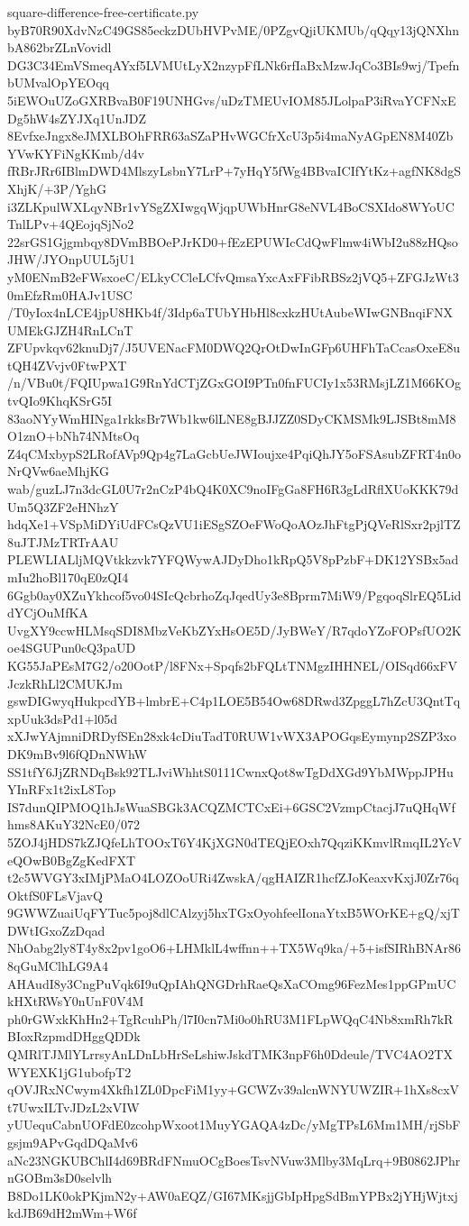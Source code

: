 \documentclass[11pt]{article}
\theoremstyle{definition}
\theoremstyle{remark}
\begin{document}
\begin{filecontents*}[overwrite]{square-difference-free-certificate.py}
byB70R90XdvNzC49GS85eckzDUbHVPvME/0PZgvQjiUKMUb/qQqy13jQNXhnbA862brZLnVovidl
DG3C34EmVSmeqAYxf5LVMUtLyX2nzypFfLNk6rfIaBxMzwJqCo3BIs9wj/TpefnbUMvalOpYEOqq
5iEWOuUZoGXRBvaB0F19UNHGvs/uDzTMEUvIOM85JLolpaP3iRvaYCFNxEDg5hW4sZYJXq1UnJDZ
8EvfxeJngx8eJMXLBOhFRR63aSZaPHvWGCfrXcU3p5i4maNyAGpEN8M40ZbYVwKYFiNgKKmb/d4v
fRBrJRr6IBlmDWD4MlszyLsbnY7LrP+7yHqY5fWg4BBvaICIfYtKz+agfNK8dgSXhjK/+3P/YghG
i3ZLKpulWXLqyNBr1vYSgZXIwgqWjqpUWbHnrG8eNVL4BoCSXIdo8WYoUCTnlLPv+4QEojqSjNo2
22srGS1Gjgmbqy8DVmBBOePJrKD0+fEzEPUWIcCdQwFlmw4iWbI2u88zHQsoJHW/JYOnpUUL5jU1
yM0ENmB2eFWsxoeC/ELkyCCleLCfvQmsaYxcAxFFibRBSz2jVQ5+ZFGJzWt30mEfzRm0HAJv1USC
/T0yIox4nLCE4jpU8HKb4f/3Idp6aTUbYHbHl8cxkzHUtAubeWIwGNBnqiFNXUMEkGJZH4RnLCnT
ZFUpvkqv62knuDj7/J5UVENacFM0DWQ2QrOtDwInGFp6UHFhTaCcasOxeE8utQH4ZVvjv0FtwPXT
/n/VBu0t/FQIUpwa1G9RnYdCTjZGxGOI9PTn0fnFUCIy1x53RMsjLZ1M66KOgtvQIo9KhqKSrG5I
83aoNYyWmHINga1rkksBr7Wb1kw6lLNE8gBJJZZ0SDyCKMSMk9LJSBt8mM8O1znO+bNh74NMtsOq
Z4qCMxbypS2LRofAVp9Qp4g7LaGcbUeJWIoujxe4PqiQhJY5oFSAsubZFRT4n0oNrQVw6aeMhjKG
wab/guzLJ7n3dcGL0U7r2nCzP4bQ4K0XC9noIFgGa8FH6R3gLdRflXUoKKK79dUm5Q3ZF2eHNhzY
hdqXe1+VSpMiDYiUdFCsQzVU1iESgSZOeFWoQoAOzJhFtgPjQVeRlSxr2pjlTZ8uJTJMzTRTrAAU
PLEWLIALljMQVtkkzvk7YFQWywAJDyDho1kRpQ5V8pPzbF+DK12YSBx5admIu2hoBl170qE0zQI4
6Ggb0ay0XZuYkhcof5vo04SIcQcbrhoZqJqedUy3e8Bprm7MiW9/PgqoqSlrEQ5LiddYCjOuMfKA
UvgXY9ccwHLMsqSDI8MbzVeKbZYxHsOE5D/JyBWeY/R7qdoYZoFOPsfUO2Koe4SGUPun0cQ3paUD
KG55JaPEsM7G2/o20OotP/l8FNx+Spqfs2bFQLtTNMgzIHHNEL/OISqd66xFVJczkRhLl2CMUKJm
gswDIGwyqHukpcdYB+lmbrE+C4p1LOE5B54Ow68DRwd3ZpggL7hZcU3QntTqxpUuk3dsPd1+l05d
xXJwYAjmniDRDyfSEn28xk4cDiuTadT0RUW1vWX3APOGqsEymynp2SZP3xoDK9mBv9l6fQDnNWhW
SS1tfY6JjZRNDqBsk92TLJviWhhtS0111CwnxQot8wTgDdXGd9YbMWppJPHuYInRFx1t2ixL8Top
IS7dunQIPMOQ1hJsWuaSBGk3ACQZMCTCxEi+6GSC2VzmpCtacjJ7uQHqWfhms8AKuY32NcE0/072
5ZOJ4jHDS7kZJQfeLhTOOxT6Y4KjXGN0dTEQjEOxh7QqziKKmvlRmqIL2YcVeQOwB0BgZgKedFXT
t2c5WVGY3xIMjPMaO4LOZOoURi4ZwskA/qgHAIZR1hcfZJoKeaxvKxjJ0Zr76qOktfS0FLsVjavQ
9GWWZuaiUqFYTuc5poj8dlCAlzyj5hxTGxOyohfeelIonaYtxB5WOrKE+gQ/xjTDWtIGxoZzDqad
NhOabg2ly8T4y8x2pv1goO6+LHMklL4wffnn++TX5Wq9ka/+5+isfSIRhBNAr868qGuMClhLG9A4
AHAudI8y3CngPuVqk6I9uQpIAhQNGDrhRaeQsXaCOmg96FezMes1ppGPmUCkHXtRWsY0nUnF0V4M
ph0rGWxkKhHn2+TgRcuhPh/l7I0cn7Mi0o0hRU3M1FLpWQqC4Nb8xmRh7kRBIoxRzpmdDHggQDDk
QMRlTJMlYLrrsyAnLDnLbHrSeLshiwJskdTMK3npF6h0Ddeule/TVC4AO2TXWYEXK1jG1ubofpT2
qOVJRxNCwym4Xkfh1ZL0DpcFiM1yy+GCWZv39alcnWNYUWZIR+1hXs8cxVt7UwxILTvJDzL2xVIW
yUUequCabnUOFdE0zcohpWxoot1MuyYGAQA4zDc/yMgTPsL6Mm1MH/rjSbFgsjm9APvGqdDQaMv6
aNc23NGKUBChlI4d69BRdFNmuOCgBoesTsvNVuw3Mlby3MqLrq+9B0862JPhrnGOBm3sD0selvlh
B8Do1LK0okPKjmN2y+AW0aEQZ/GI67MKsjjGbIpHpgSdBmYPBx2jYHjWjtxjkdJB69dH2mWm+W6f

\end{filecontents*}
\end{document}
